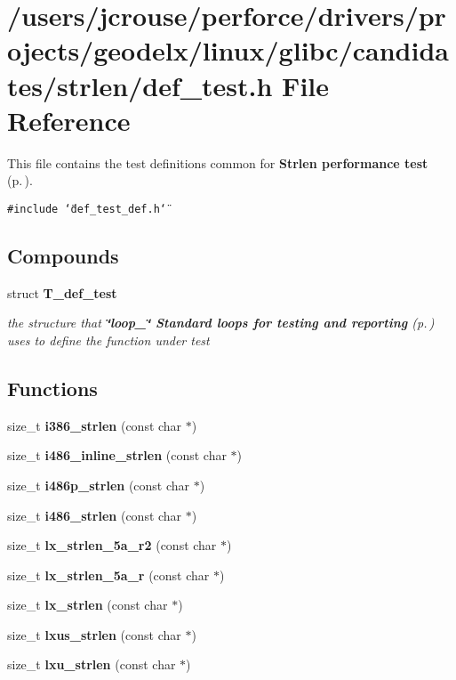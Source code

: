 \section{/users/jcrouse/perforce/drivers/projects/geodelx/linux/glibc/candidates/strlen/def\_\-test.h File Reference}
\label{strlen_2def__test_8h}
This file contains the test definitions common for {\bf Strlen performance test} {\rm (p.\,\pageref{group__strlen__test})}. 


{\tt \#include \char`\"{}def\_\-test\_\-def.h\char`\"{}}\par
\subsection*{Compounds}
\begin{CompactItemize}
\item 
struct {\bf T\_\-def\_\-test}
\begin{CompactList}\small\item\em the structure that {\bf \char`\"{}loop\_\-\char`\"{} Standard loops for testing and reporting} {\rm (p.\,\pageref{group__loop__test})} uses to define the function under test\item\end{CompactList}\end{CompactItemize}
\subsection*{Functions}
\begin{CompactItemize}
\item 
size\_\-t {\bf i386\_\-strlen} (const char $\ast$)
\item 
size\_\-t {\bf i486\_\-inline\_\-strlen} (const char $\ast$)
\item 
size\_\-t {\bf i486p\_\-strlen} (const char $\ast$)
\item 
size\_\-t {\bf i486\_\-strlen} (const char $\ast$)
\item 
size\_\-t {\bf lx\_\-strlen\_\-5a\_\-r2} (const char $\ast$)
\item 
size\_\-t {\bf lx\_\-strlen\_\-5a\_\-r} (const char $\ast$)
\item 
size\_\-t {\bf lx\_\-strlen} (const char $\ast$)
\item 
size\_\-t {\bf lxus\_\-strlen} (const char $\ast$)
\item 
size\_\-t {\bf lxu\_\-strlen} (const char $\ast$)
\end{CompactItemize}


